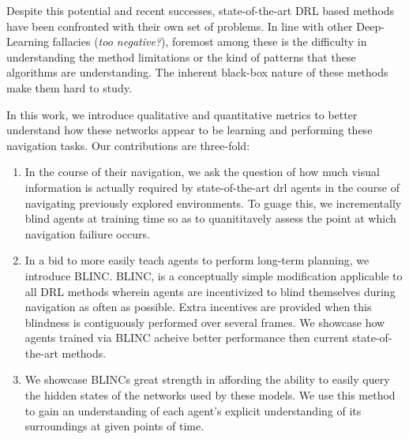 Despite this potential and recent successes, state-of-the-art DRL based methods have been confronted with their own set of problems. In line with other Deep-Learning fallacies (\textit{too negative?}), foremost among these is the difficulty in understanding the method limitations or the kind of patterns that these algorithms are understanding. The inherent black-box nature of these methods make them hard to study. 

In this work, we introduce qualitative and quantitative metrics to better understand how these networks appear to be learning and performing these navigation tasks. Our contributions are three-fold:
\begin{enumerate}
\item In the course of their navigation, we ask the question of how much visual information is actually required by state-of-the-art drl agents in the course of navigating previously explored environments. To guage this, we incrementally blind agents at training time so as to quanititavely assess the point at which navigation failiure occurs.
\item In a bid to more easily teach agents to perform long-term planning, we introduce BLINC. BLINC, is a conceptually simple modification applicable to all DRL methods wherein agents are incentivized to blind themselves during navigation as often as possible. Extra  incentives are provided when this blindness is contiguously performed over several frames.  We showcase how agents trained via BLINC acheive better performance then current state-of-the-art methods. 
\item We showcase BLINCs great strength in affording the ability to easily query the hidden states of the networks used by these models. We use this method to gain an understanding of each agent's explicit understanding of its surroundings at given points of time.
\end {enumerate}

